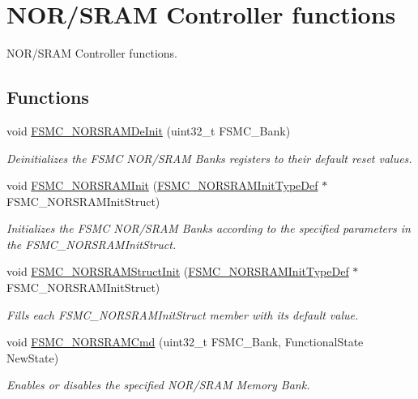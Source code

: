\hypertarget{group___f_s_m_c___group1}{\section{N\-O\-R/\-S\-R\-A\-M Controller functions}
\label{group___f_s_m_c___group1}
}


N\-O\-R/\-S\-R\-A\-M Controller functions.  


\subsection*{Functions}
\begin{DoxyCompactItemize}
\item 
void \hyperlink{group___f_s_m_c___group1_gaab3e6648e8a584e73785361ac960eded}{F\-S\-M\-C\-\_\-\-N\-O\-R\-S\-R\-A\-M\-De\-Init} (uint32\-\_\-t F\-S\-M\-C\-\_\-\-Bank)
\begin{DoxyCompactList}\small\item\em Deinitializes the F\-S\-M\-C N\-O\-R/\-S\-R\-A\-M Banks registers to their default reset values. \end{DoxyCompactList}\item 
void \hyperlink{group___f_s_m_c___group1_ga9c27816e8b17394c9ee1ce9298917b4a}{F\-S\-M\-C\-\_\-\-N\-O\-R\-S\-R\-A\-M\-Init} (\hyperlink{struct_f_s_m_c___n_o_r_s_r_a_m_init_type_def}{F\-S\-M\-C\-\_\-\-N\-O\-R\-S\-R\-A\-M\-Init\-Type\-Def} $\ast$F\-S\-M\-C\-\_\-\-N\-O\-R\-S\-R\-A\-M\-Init\-Struct)
\begin{DoxyCompactList}\small\item\em Initializes the F\-S\-M\-C N\-O\-R/\-S\-R\-A\-M Banks according to the specified parameters in the F\-S\-M\-C\-\_\-\-N\-O\-R\-S\-R\-A\-M\-Init\-Struct. \end{DoxyCompactList}\item 
void \hyperlink{group___f_s_m_c___group1_gaf33e6dfc34f62d16a0cb416de9e83d28}{F\-S\-M\-C\-\_\-\-N\-O\-R\-S\-R\-A\-M\-Struct\-Init} (\hyperlink{struct_f_s_m_c___n_o_r_s_r_a_m_init_type_def}{F\-S\-M\-C\-\_\-\-N\-O\-R\-S\-R\-A\-M\-Init\-Type\-Def} $\ast$F\-S\-M\-C\-\_\-\-N\-O\-R\-S\-R\-A\-M\-Init\-Struct)
\begin{DoxyCompactList}\small\item\em Fills each F\-S\-M\-C\-\_\-\-N\-O\-R\-S\-R\-A\-M\-Init\-Struct member with its default value. \end{DoxyCompactList}\item 
void \hyperlink{group___f_s_m_c___group1_gaf943f0f2680168d3a95a3c2c9f3eca2a}{F\-S\-M\-C\-\_\-\-N\-O\-R\-S\-R\-A\-M\-Cmd} (uint32\-\_\-t F\-S\-M\-C\-\_\-\-Bank, Functional\-State New\-State)
\begin{DoxyCompactList}\small\item\em Enables or disables the specified N\-O\-R/\-S\-R\-A\-M Memory Bank. \end{DoxyCompactList}\end{DoxyCompactItemize}


